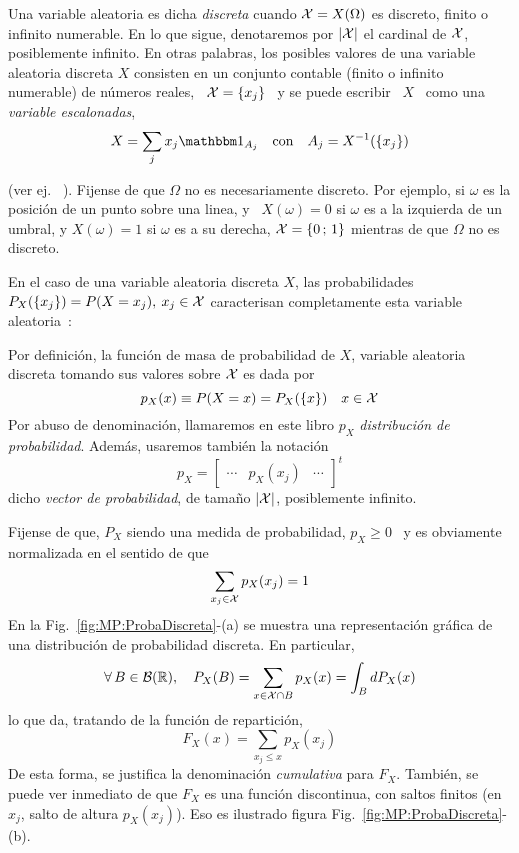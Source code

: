 
\label{sec:MP:VADiscreta}

\begin{definicion}
  Una  variable aleatoria es  dicha {\it  discreta} cuando  $\mathcal{X} =  X(\Omega)$ es
  discreto,  finito o  infinito numerable.   En  lo que  sigue, denotaremos  por
  $|\mathcal{X}|$  el cardinal  de $\mathcal{X}$,  posiblemente infinito.  En otras  palabras, los
  posibles  valores de  una  variable  aleatoria discreta  $X$  consisten en  un
  conjunto contable (finito  o infinito numerable) de n\'umeros  reales, \ $\mathcal{X} =
  \{ x_j \}$ \ y se puede escribir \ $X$ \ como una {\it variable escalonadas},
  \[
  X = \sum_j x_j \un_{A_j} \quad \mbox{con} \quad A_j = X^{-1}(\{ x_j \})
  \]
\end{definicion}
%
\noindent (ver ej.  ~\cite{AthLah06, HogMck13}).  Fijense de que  $\Omega$ no es
necesariamente discreto.  Por ejemplo, si  $\omega$ es la posici\'on de un punto
sobre una linea, y \ $X(\omega) = 0$ si $\omega$ es a la izquierda de un umbral, y
$X(\omega) = 1$ si $\omega$  es a su derecha, $\mathcal{X} = \{ 0 \,  ; \, 1 \}$ mientras
de que $\Omega$ no es discreto.

En el  caso de una variable  aleatoria discreta $X$,  las probabilidades $P_X(\{
x_j \})  = P(X = x_j), \:  x_j \in \mathcal{X}$ caracterisan  completamente esta variable
aleatoria~\cite{AthLah06, HogMck13}:
%
\begin{definicion}
  Por  definici\'on, la  funci\'on  de  masa de  probabilidad  de $X$,  variable
  aleatoria discreta tomando sus valores sobre $\mathcal{X}$ es dada por
  \[
  p_X(x) \equiv P(X = x) = P_X( \{ x\} ) \quad x \in \mathcal{X}
  \]
  Por   abuso  de   denominaci\'on,  llamaremos   en  este   libro   $p_X$  {\it
    distribuci\'on de probabilidad}. Adem\'as, usaremos tambi\'en la notaci\'on
  \[
  p_X = \begin{bmatrix} \cdots & p_X(x_j) & \cdots \end{bmatrix}^t
  \]
  dicho {\it vector de probabilidad}, de tama\~no $|\mathcal{X}|$, posiblemente infinito.
\end{definicion}
%
Fijense de  que, $P_X$ siendo  una medida  de probabilidad, $p_X  \ge 0$ \  y es
obviamente normalizada en el sentido de que
%
\[
\sum_{x_j \in \mathcal{X}} p_X(x_j) = 1
\]
%
En  la  Fig.~\ref{fig:MP:ProbaDiscreta}-(a)   se  muestra  una  representaci\'on
gr\'afica de una distribuci\'on de probabilidad discreta.
%
En particular,
%
\[
\forall \,  B \in  \mathcal{B}(\mathbb{R}), \quad  P_X(B) = \sum_{x  \in \mathcal{X}  \cap B}  p_X(x) =
\int_B dP_X(x)
\]
%
lo que da, tratando de la funci\'on de repartici\'on,
%
\[
F_X(x) = \sum_{x_j \le x} p_X(x_j)
\]
%
De  esta forma,  se justifica  la  denominaci\'on {\it  cumulativa} para  $F_X$.
Tambi\'en, se puede ver inmediato de que $F_X$ es una funci\'on discontinua, con
saltos finitos (en  $x_j$, salto de altura $p_X(x_j)$).  Eso es ilustrado figura
Fig.~\ref{fig:MP:ProbaDiscreta}-(b).

